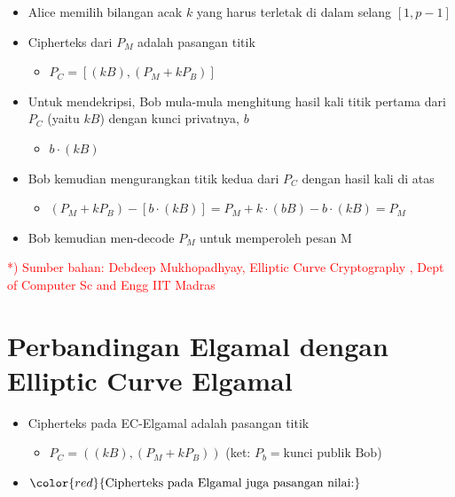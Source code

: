 \documentclass{article}
\begin{document}
\begin{itemize}
    \item Alice memilih bilangan acak $k$ yang harus terletak di dalam selang $[1, p-1]$
    \item Cipherteks dari $P_M$ adalah pasangan titik
    \begin{itemize}
        \item $P_C = [ ( kB), (P_M + kP_B) ]$
    \end{itemize}
    \item Untuk mendekripsi, Bob mula-mula menghitung hasil kali titik pertama dari $P_C$ (yaitu $kB$) dengan kunci privatnya, $b$
    \begin{itemize}
        \item $b \cdot (kB)$
    \end{itemize}
    \item Bob kemudian mengurangkan titik kedua dari $P_C$ dengan hasil kali di atas
    \begin{itemize}
        \item $(P_M + kP_B) - [b \cdot (kB)] = P_M + k \cdot (bB) - b \cdot (kB) = P_M$
    \end{itemize}
    \item Bob kemudian men-decode $P_M$ untuk memperoleh pesan M
\end{itemize}

\vspace{10mm}

\textcolor{red}{*) Sumber bahan: Debdeep Mukhopadhyay, Elliptic Curve Cryptography , Dept of Computer Sc and Engg IIT Madras}

\newpage


\section*{Perbandingan Elgamal dengan Elliptic Curve Elgamal}

\begin{itemize}
    \item Cipherteks pada EC-Elgamal adalah pasangan titik
    \begin{itemize}
        \item $P_C = ( (kB), (P_M + kP_B) )$ \quad (ket: $P_b = \text{kunci publik Bob}$)
    \end{itemize}
    
    \item $\color{red}{\text{Cipherteks pada Elgamal juga pasangan nilai:}}$
\end{itemize}
\end{document}
